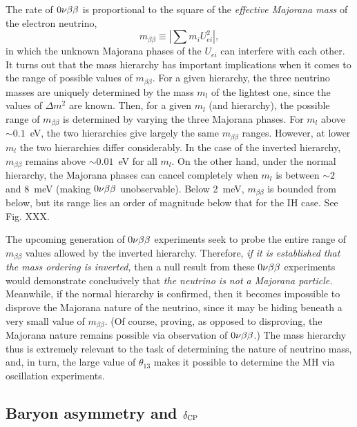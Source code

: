 \documentclass[../thesis.tex]{subfiles}
\begin{document}
The rate of $0\nu\beta\beta$ is proportional to the square of the \emph{effective
  Majorana mass} of the electron neutrino,
\begin{equation*}
  m_{\beta\beta} \equiv \left| \sum m_i U^2_{ei} \right|,
\end{equation*}
in which the unknown Majorana phases of the $U_{ei}$ can interfere with each
other. It turns out that the mass hierarchy has important implications when it
comes to the range of possible values of $m_{\beta\beta}$. For a given hierarchy, the
three neutrino masses are uniquely determined by the mass $m_l$ of the lightest
one, since the values of $\Delta m^2$ are known. Then, for a given $m_l$ (and
hierarchy), the possible range of $m_{\beta\beta}$ is determined by varying the three
Majorana phases. For $m_l$ above $\sim0.1$~eV, the two hierarchies give largely the
same $m_{\beta\beta}$ ranges. However, at lower $m_l$ the two hierarchies differ
considerably. In the case of the inverted hierarchy, $m_{\beta\beta}$ remains above
$\sim0.01$~eV for all $m_l$. On the other hand, under the normal hierarchy, the
Majorana phases can cancel completely when $m_l$ is between $\sim2$ and 8~meV
(making $0\nu\beta\beta$ unobservable). Below 2~meV, $m_{\beta\beta}$ is bounded from below, but
its range lies an order of magnitude below that for the IH case. See Fig. XXX.

The upcoming generation of $0\nu\beta\beta$ experiments seek to probe the entire range of
$m_{\beta\beta}$ values allowed by the inverted hierarchy. Therefore, \emph{if it is
  established that the mass ordering is inverted,} then a null result from these
$0\nu\beta\beta$ experiments would demonstrate conclusively that \emph{the neutrino is
  not a Majorana particle.} Meanwhile, if the normal hierarchy is confirmed,
then it becomes impossible to disprove the Majorana nature of the neutrino,
since it may be hiding beneath a very small value of $m_{\beta\beta}$. (Of course,
proving, as opposed to disproving, the Majorana nature remains possible via
observation of $0\nu\beta\beta$.) The mass hierarchy thus is extremely relevant to the
task of determining the nature of neutrino mass, and, in turn, the large value
of $\theta_{13}$ makes it possible to determine the MH via oscillation experiments.

\subsection{Baryon asymmetry and $\delta_\text{CP}$}
\label{sec:baryonAsym}
\end{document}
